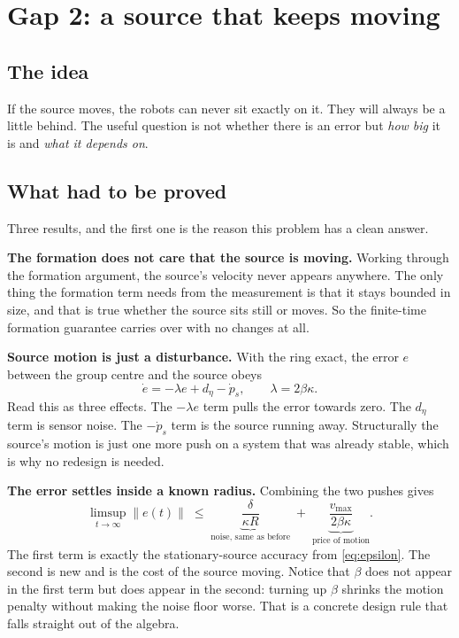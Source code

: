 \documentclass[11pt,a4paper]{article}
\begin{document}
\section{Gap 2: a source that keeps moving}

\subsection{The idea}

If the source moves, the robots can never sit exactly on it. They will always be a little behind.
The useful question is not whether there is an error but \emph{how big} it is and \emph{what it
depends on}.

\subsection{What had to be proved}

Three results, and the first one is the reason this problem has a clean answer.

\textbf{The formation does not care that the source is moving.} Working through the formation
argument, the source's velocity never appears anywhere. The only thing the formation term needs from
the measurement is that it stays bounded in size, and that is true whether the source sits still or
moves. So the finite-time formation guarantee carries over with no changes at all.

\textbf{Source motion is just a disturbance.} With the ring exact, the error $e$ between the group
centre and the source obeys
\begin{equation}\label{eq:movingdyn}
    \dot e = -\lambda e + d_\eta - \dot p_s,
    \qquad \lambda = 2\beta\kappa .
\end{equation}
Read this as three effects. The $-\lambda e$ term pulls the error towards zero. The $d_\eta$ term is
sensor noise. The $-\dot p_s$ term is the source running away. Structurally the source's motion is
just one more push on a system that was already stable, which is why no redesign is needed.

\textbf{The error settles inside a known radius.} Combining the two pushes gives
\begin{equation}\label{eq:movingbound}
    \limsup_{t\to\infty} \| e(t) \|
    \;\leq\;
    \underbrace{\frac{\delta}{\kappa R}}_{\text{noise, same as before}}
    \;+\;
    \underbrace{\frac{v_{\max}}{2\beta\kappa}}_{\text{price of motion}} .
\end{equation}
The first term is exactly the stationary-source accuracy from \eqref{eq:epsilon}. The second is new
and is the cost of the source moving. Notice that $\beta$ does not appear in the first term but does
appear in the second: turning up $\beta$ shrinks the motion penalty without making the noise floor
worse. That is a concrete design rule that falls straight out of the algebra.
\end{document}
